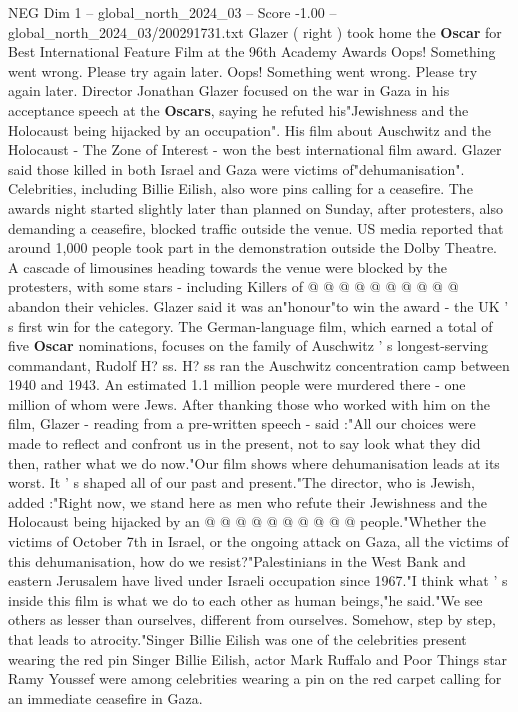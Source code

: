 \begin{textsample}{NEG Dim 1 – global\_north\_2024\_03 – Score -1.00 – global\_north\_2024\_03/200291731.txt}  \label{ex:f1_neg_075}
Glazer ( right ) took home the \textbf{Oscar} for Best International Feature Film at the 96th Academy Awards Oops!
Something went wrong.
Please try again later.
Oops!
Something went wrong.
Please try again later.
Director Jonathan Glazer focused on the war in Gaza in his acceptance speech at the \textbf{Oscars}, saying he refuted his"Jewishness and the Holocaust being hijacked by an occupation".
His film about Auschwitz and the Holocaust - The Zone of Interest - won the best international film award.
Glazer said those killed in both Israel and Gaza were victims of"dehumanisation".
Celebrities, including Billie Eilish, also wore pins calling for a ceasefire.
The awards night started slightly later than planned on Sunday, after protesters, also demanding a ceasefire, blocked traffic outside the venue.
US media reported that around 1,000 people took part in the demonstration outside the Dolby Theatre.
A cascade of limousines heading towards the venue were blocked by the protesters, with some stars - including Killers of @ @ @ @ @ @ @ @ @ @ abandon their vehicles.
Glazer said it was an"honour"to win the award - the UK ' s first win for the category.
The German-language film, which earned a total of five \textbf{Oscar} nominations, focuses on the family of Auschwitz ' s longest-serving commandant, Rudolf H? ss.
H? ss ran the Auschwitz concentration camp between 1940 and 1943.
An estimated 1.1 million people were murdered there - one million of whom were Jews.
After thanking those who worked with him on the film, Glazer - reading from a pre-written speech - said :"All our choices were made to reflect and confront us in the present, not to say look what they did then, rather what we do now."Our film shows where dehumanisation leads at its worst.
It ' s shaped all of our past and present."The director, who is Jewish, added :"Right now, we stand here as men who refute their Jewishness and the Holocaust being hijacked by an @ @ @ @ @ @ @ @ @ @ people."Whether the victims of October 7th in Israel, or the ongoing attack on Gaza, all the victims of this dehumanisation, how do we resist?"Palestinians in the West Bank and eastern Jerusalem have lived under Israeli occupation since 1967."I think what ' s inside this film is what we do to each other as human beings,"he said."We see others as lesser than ourselves, different from ourselves.
Somehow, step by step, that leads to atrocity."Singer Billie Eilish was one of the celebrities present wearing the red pin Singer Billie Eilish, actor Mark Ruffalo and Poor Things star Ramy Youssef were among celebrities wearing a pin on the red carpet calling for an immediate ceasefire in Gaza.

\end{textsample}
